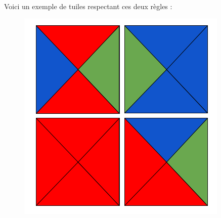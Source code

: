 \documentclass[11pt]{article}
\begin{document}
Voici un exemple de tuiles respectant ces deux règles :
\begin{figure}[H]
\centering
\includegraphics[scale=0.2]{Tuiles exemple.png}
\end{figure}
\end{document}
